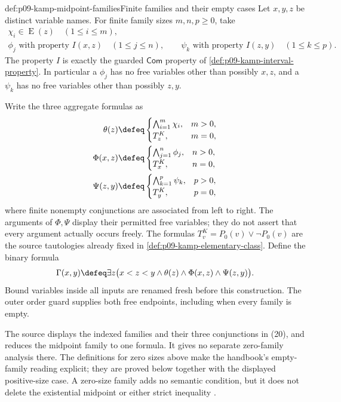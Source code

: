 \begin{hbconvention}{def:p09-kamp-midpoint-families}{Finite families and their empty cases}
Let \(x,y,z\) be distinct variable names. For finite family sizes
\(m,n,p\geq0\), take
\[
\begin{gathered}
 \chi_i\in\operatorname{E}(z)\quad(1\leq i\leq m),\\
 \phi_j\text{ with property }I(x,z)\quad(1\leq j\leq n),\qquad
 \psi_k\text{ with property }I(z,y)\quad(1\leq k\leq p).
\end{gathered}
\]
The property \(I\) is exactly the guarded \(\mathsf{Com}\) property
of \cref{def:p09-kamp-interval-property}. In particular a \(\phi_j\)
has no free variables other than possibly \(x,z\), and a \(\psi_k\)
has no free variables other than possibly \(z,y\).

Write the three aggregate formulas as
\[
\begin{aligned}
 \theta(z)&\defeq
  \begin{cases}\bigwedge_{i=1}^{m}\chi_i,&m>0,\\T^K_z,&m=0,\end{cases}\\
 \Phi(x,z)&\defeq
  \begin{cases}\bigwedge_{j=1}^{n}\phi_j,&n>0,\\T^K_x,&n=0,\end{cases}\\
 \Psi(z,y)&\defeq
  \begin{cases}\bigwedge_{k=1}^{p}\psi_k,&p>0,\\T^K_y,&p=0,\end{cases}
\end{aligned}
\]
where finite nonempty conjunctions are associated from left to right.
The arguments of \(\Phi,\Psi\) display their permitted free variables;
they do not assert that every argument actually occurs freely.
The formulas \(T^K_v=P_0(v)\lor\neg P_0(v)\) are the source
tautologies already fixed in \cref{def:p09-kamp-elementary-class}.
Define the binary formula
\[
 \Gamma(x,y)\defeq
 \exists z\bigl(x<z<y\land\theta(z)\land\Phi(x,z)\land\Psi(z,y)\bigr).
\]
Bound variables inside all inputs are renamed fresh before this
construction. The outer order guard supplies both free endpoints,
including when every family is empty.

The source displays the indexed families and their three conjunctions
in (20), and reduces the midpoint family to one formula. It gives no
separate zero-family analysis there. The definitions for zero sizes
above make the handbook's empty-family reading explicit; they are
proved below together with the displayed positive-size case. A
zero-size family adds no semantic condition, but it does not delete
the existential midpoint or either strict inequality
\cite[ch.~III, p.~78]{Kamp1968}.
\end{hbconvention}

